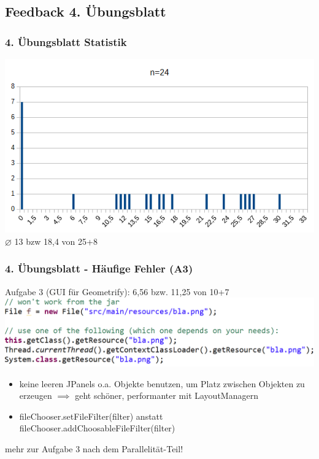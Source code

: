 \documentclass[18pt]{beamer}
\begin{document}
	\subsection{Feedback 4. Übungsblatt}
	\begin{frame}
		\frametitle{4. Übungsblatt Statistik}
		\includegraphics[scale=0.7]{./pics/tut5/statistics-ub5.png}
		\linebreak \centering $\diameter$ 13 bzw 18,4 von 25+8
	\end{frame}

	\begin{frame}
		\frametitle{4. Übungsblatt - Häufige Fehler (A3)}
		\begin{block}{Aufgabe 3 (GUI für Geometrify): 6,56 bzw. 11,25 von 10+7} 
			\includegraphics[scale=0.34]{./pics/tut5/file-resource.png}
			\begin{itemize}
				\pause
				\item keine leeren JPanels o.a. Objekte benutzen, um Platz zwischen Objekten zu erzeugen
				\linebreak $\implies$ geht schöner, performanter mit LayoutManagern \pause
				\item fileChooser.setFileFilter(filter) anstatt fileChooser.addChoosableFileFilter(filter)
			\end{itemize}
			\pause 
			mehr zur Aufgabe 3 nach dem Parallelität-Teil!
		\end{block}
	\end{frame}
\end{document}
